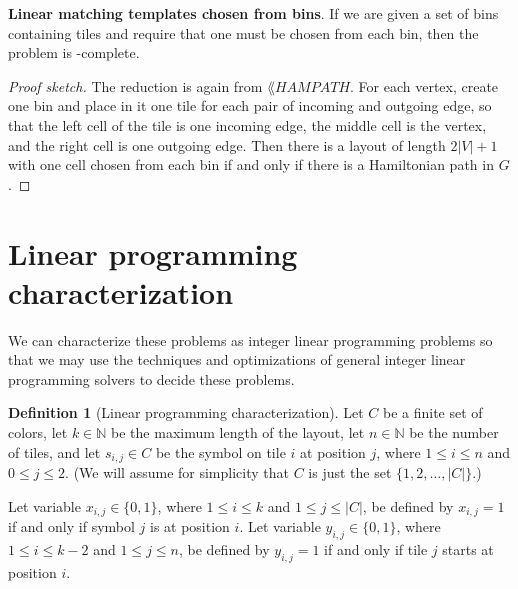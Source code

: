 \documentclass{lposter}
\theoremstyle{definition} \newtheorem*{definition}{Definition}
\begin{document}
\begin{poster}
{\bf Linear matching templates chosen from bins}. If we are given a set of bins
containing tiles and require that one must be chosen from each bin, then the
problem is \NP-complete.

\begin{proof}[Proof sketch]
  The reduction is again from $\lang{HAMPATH}$. For each vertex, create one bin
  and place in it one tile for each pair of incoming and outgoing edge, so that
  the left cell of the tile is one incoming edge, the middle cell is the
  vertex, and the right cell is one outgoing edge. Then there is a layout of
  length $2|V| + 1$ with one cell chosen from each bin if and only if there is
  a Hamiltonian path in $G$.
\end{proof}

\section{Linear programming characterization}

We can characterize these problems as integer linear programming problems so
that we may use the techniques and optimizations of general integer linear
programming solvers to decide these problems.

\begin{shaded}
\begin{definition}[Linear programming characterization]
  Let $C$ be a finite set of colors, let $k\in\mathbb{N}$ be the maximum
  length of the layout, let $n\in\mathbb{N}$ be the number of tiles, and let
  $s_{i,j}\in C$ be the symbol on tile $i$ at position $j$, where $1\leq i\leq
  n$ and $0\leq j\leq 2$. (We will assume for simplicity that $C$ is just the
  set $\{1, 2,\ldots, |C|\}$.)

  Let variable $x_{i,j}\in\{0, 1\}$, where $1\leq i\leq k$ and $1\leq j\leq
  |C|$, be defined by $x_{i, j} = 1$ if and only if symbol $j$ is at position
  $i$. Let variable $y_{i,j}\in\{0, 1\}$, where $1\leq i\leq k-2$ and $1\leq
  j\leq n$, be defined by $y_{i, j} = 1$ if and only if tile $j$ starts at
  position $i$.
    

\end{definition}
\end{shaded}
\end{poster}
\end{document}
